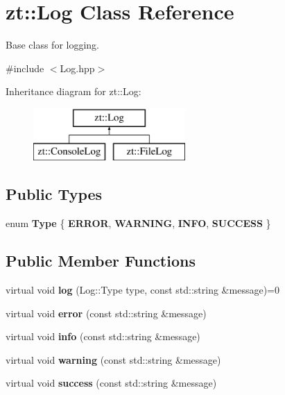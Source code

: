 \hypertarget{classzt_1_1_log}{}\section{zt\+:\+:Log Class Reference}
\label{classzt_1_1_log}


Base class for logging.  




{\ttfamily \#include $<$Log.\+hpp$>$}

Inheritance diagram for zt\+:\+:Log\+:\begin{figure}[H]
\begin{center}
\leavevmode
\includegraphics[height=2.000000cm]{classzt_1_1_log}
\end{center}
\end{figure}
\subsection*{Public Types}
\begin{DoxyCompactItemize}
\item 
\mbox{\label{classzt_1_1_log_aec3ae67596b29202b7154380cbdb3ae9}} 
enum {\bfseries Type} \{ {\bfseries E\+R\+R\+OR}, 
{\bfseries W\+A\+R\+N\+I\+NG}, 
{\bfseries I\+N\+FO}, 
{\bfseries S\+U\+C\+C\+E\+SS}
 \}
\end{DoxyCompactItemize}
\subsection*{Public Member Functions}
\begin{DoxyCompactItemize}
\item 
\mbox{\label{classzt_1_1_log_ad2cf7a53c6646b187dca65cbcf667d6c}} 
virtual void {\bfseries log} (Log\+::\+Type type, const std\+::string \&message)=0
\item 
\mbox{\label{classzt_1_1_log_a07977fb4dc29aea94383c5700f72492a}} 
virtual void {\bfseries error} (const std\+::string \&message)
\item 
\mbox{\label{classzt_1_1_log_ac6e0e1586ccf2239136df6e1a98e2b8e}} 
virtual void {\bfseries info} (const std\+::string \&message)
\item 
\mbox{\label{classzt_1_1_log_a11094b09c3e1d6d60ca501f4889fe266}} 
virtual void {\bfseries warning} (const std\+::string \&message)
\item 
\mbox{\label{classzt_1_1_log_a00f9214b32a771bc11a08d2fac88dea7}} 
virtual void {\bfseries success} (const std\+::string \&message)
\end{DoxyCompactItemize}
